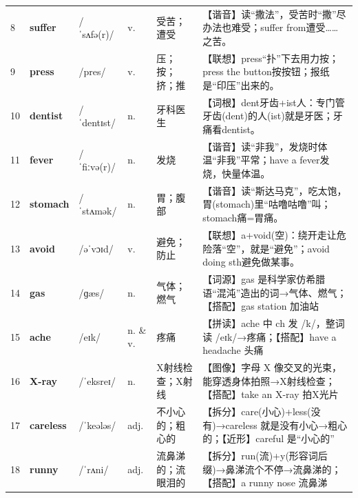 \documentclass[UTF8,a4paper,11pt,oneside]{ctexbook}
\newcommand{\cellword}[1]{{\bfseries\textcolor{wordcol}{#1}}}
\newcommand{\cellipa}[1]{{\footnotesize\textcolor{ipacol}{#1}}}
\newcommand{\cellpos}[1]{\textcolor{poscol}{#1}}
\newcommand{\cellno}[1]{\textcolor{volcolor!75!black}{#1}}
\begin{document}
{\begin{longtable}{@{}C{0.045\textwidth}L{0.155\textwidth}L{0.175\textwidth}C{0.070\textwidth}L{0.180\textwidth}L{0.282\textwidth}@{}}
\cellno{8} & \cellword{suffer} & \cellipa{/ˈsʌfə(r)/} & \cellpos{v.} & 受苦；遭受 & \textcolor{tagSound}{【谐音】}读“撒法”，受苦时“撒”尽办法也难受；suffer from遭受……之苦。 \\
 \cellno{9} & \cellword{press} & \cellipa{/pres/} & \cellpos{v.} & 压；按；挤；推 & \textcolor{tagAssoc}{【联想】}press“扑”下去用力按；press the button按按钮；报纸是“印压”出来的。 \\
\cellno{10} & \cellword{dentist} & \cellipa{/ˈdentɪst/} & \cellpos{n.} & 牙科医生 & \textcolor{tagRoot}{【词根】}dent牙齿+ist人：专门管牙齿(dent)的人(ist)就是牙医；牙痛看dentist。 \\
 \cellno{11} & \cellword{fever} & \cellipa{/ˈfiːvə(r)/} & \cellpos{n.} & 发烧 & \textcolor{tagSound}{【谐音】}读“非我”，发烧时体温“非我”平常；have a fever发烧，快量体温。 \\
\cellno{12} & \cellword{stomach} & \cellipa{/ˈstʌmək/} & \cellpos{n.} & 胃；腹部 & \textcolor{tagSound}{【谐音】}读“斯达马克”，吃太饱，胃(stomach)里“咕噜咕噜”叫；stomach痛=胃痛。 \\
 \cellno{13} & \cellword{avoid} & \cellipa{/əˈvɔɪd/} & \cellpos{v.} & 避免；防止 & \textcolor{tagAssoc}{【联想】}a+void(空)：绕开走让危险落“空”，就是“避免”；avoid doing sth避免做某事。 \\
\cellno{14} & \cellword{gas} & \cellipa{/ɡæs/} & \cellpos{n.} & 气体；燃气 & \textcolor{tagEtym}{【词源】}gas 是科学家仿希腊语“混沌”造出的词→\allowbreak{}气体、燃气；\textcolor{tagColloc}{【搭配】}gas station 加油站 \\
 \cellno{15} & \cellword{ache} & \cellipa{/eɪk/} & \cellpos{n.  \& v.} & 疼痛 & \textcolor{tagSpell}{【拼读】}ache 中 ch 发 /k/，整词读 /eɪk/→\allowbreak{}疼痛；\textcolor{tagColloc}{【搭配】}have a headache 头痛 \\
\cellno{16} & \cellword{X-ray} & \cellipa{/ˈeksreɪ/} & \cellpos{n.} & X射线检查；X射线 & \textcolor{tagImage}{【图像】}字母 X 像交叉的光束，能穿透身体拍照→\allowbreak{}X射线检查；\textcolor{tagColloc}{【搭配】}take an X-ray 拍X光片 \\
 \cellno{17} & \cellword{careless} & \cellipa{/ˈkeələs/} & \cellpos{adj.} & 不小心的；粗心的 & \textcolor{tagSplit}{【拆分】}care(小心)+less(没有)→\allowbreak{}careless 就是没有小心→\allowbreak{}粗心的；\textcolor{tagNear}{【近形】}careful 是“小心的” \\
\cellno{18} & \cellword{runny} & \cellipa{/ˈrʌni/} & \cellpos{adj.} & 流鼻涕的；流眼泪的 & \textcolor{tagSplit}{【拆分】}run(流)+y(形容词后缀)→\allowbreak{}鼻涕流个不停→\allowbreak{}流鼻涕的；\textcolor{tagColloc}{【搭配】}a runny nose 流鼻涕 \\

\end{longtable}}
\end{document}
